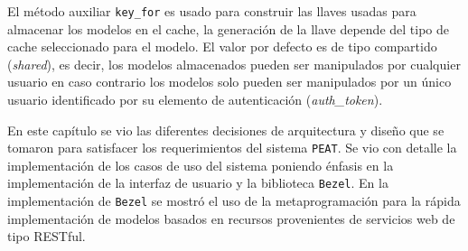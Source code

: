 El método auxiliar \texttt{key\_for} es usado para construir las llaves usadas para
almacenar los modelos en el cache, la generación de la llave depende del tipo de
cache seleccionado para el modelo.
El valor por defecto es de tipo compartido (\textit{shared}), es decir, los
modelos almacenados pueden ser manipulados por cualquier usuario en caso contrario
los modelos solo pueden ser manipulados por un único usuario identificado por su
elemento de autenticación (\textit{auth\_token}).

En este capítulo se vio las diferentes decisiones de arquitectura y diseño que
se tomaron para satisfacer los requerimientos del sistema \texttt{PEAT}.
Se vio con detalle la implementación de los casos de uso del sistema poniendo énfasis
en la implementación de la interfaz de usuario y la biblioteca \texttt{Bezel}.
En la implementación de \texttt{Bezel} se mostró el uso de la metaprogramación
para la rápida implementación de modelos basados en recursos provenientes de
servicios web de tipo RESTful.

